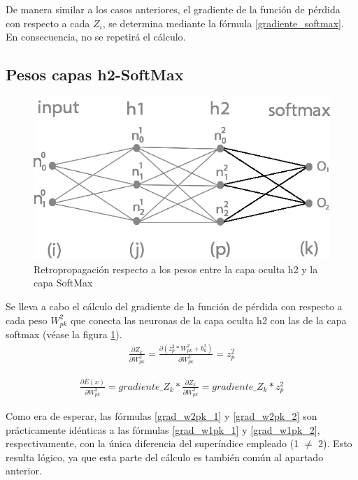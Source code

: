 De manera similar a los casos anteriores, el gradiente de la función de pérdida con respecto a cada $Z_i$, se determina mediante la fórmula \ref{gradiente_softmax}. En consecuencia, no se repetirá el cálculo. \\

\subsection{Pesos capas h2-SoftMax}

\begin{figure}[H]
	\centering
	\includegraphics[scale=0.35]{imagenes/nn_2_capa_pesos_h2_output.jpg}  
	\caption{Retropropagación respecto a los pesos entre la capa oculta h2 y la capa SoftMax}
	\label{fig:nn_2_capa_pesos_h2_output}
\end{figure}

Se lleva a cabo el cálculo del gradiente de la función de pérdida con respecto a cada peso $W^2_{pk}$ que conecta las neuronas de la capa oculta h2 con las de la capa softmax (véase la figura \ref{fig:nn_2_capa_pesos_h2_output}). \\

\begin{gather}
	\frac{\partial Z_k}{\partial W^2_{pk}} = \frac{\partial (z^2_p * W^2 _{pk} + b^3_k)}{\partial W^2_{pk }} = z^2_p 
	\label{grad_w2pk_1}
\end{gather}

\begin{gather}
	\frac{\partial E(x)}{\partial W^2_{pk }} =  gradiente\_Z_k * \frac{\partial Z_k}{\partial W^2_{pk }} = gradiente\_Z_k * z^2_p
	\label{grad_w2pk_2}
\end{gather}

Como era de esperar, las fórmulas \ref{grad_w2pk_1} y \ref{grad_w2pk_2} son prácticamente idénticas a las fórmulas \ref{grad_w1pk_1} y \ref{grad_w1pk_2}, respectivamente, con la única diferencia del superíndice empleado (1 $\neq$ 2). Esto resulta lógico, ya que esta parte del cálculo es también común al apartado anterior.

